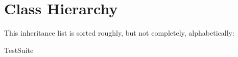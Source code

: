 \section{Class Hierarchy}
This inheritance list is sorted roughly, but not completely, alphabetically\+:\begin{DoxyCompactList}
\item {}
\item {}
\item Test\+Suite\begin{DoxyCompactList}
\item {}
\end{DoxyCompactList}
\end{DoxyCompactList}
